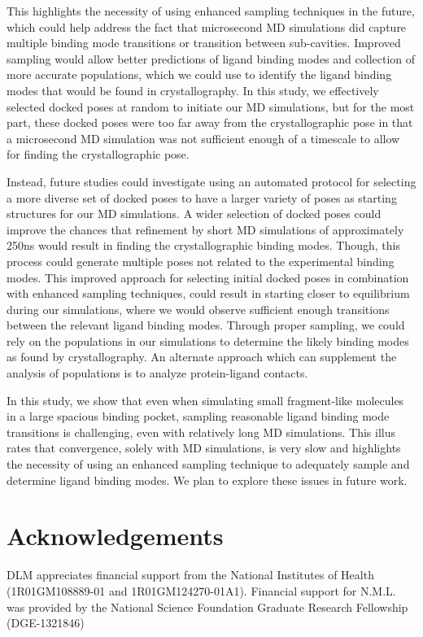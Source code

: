 This highlights the necessity of using enhanced sampling techniques in the future, which could help address the fact that microsecond MD simulations did capture multiple binding mode transitions or transition between sub-cavities.
Improved sampling would allow better predictions of ligand binding modes and collection of more accurate populations, which we could use to identify the ligand binding modes that would be found in crystallography.
In this study, we effectively selected docked poses at random to initiate our MD simulations, but for the most part, these docked poses were too far away from the crystallographic pose in that a microsecond MD simulation was not sufficient enough of a timescale to allow for finding the crystallographic pose.

Instead, future studies could investigate using an automated protocol for selecting a more diverse set of docked poses to have a larger variety of poses as starting structures for our MD simulations.
A wider selection of docked poses could improve the chances that refinement by short MD simulations of approximately 250ns would result in finding the crystallographic binding modes. 
Though, this process could generate multiple poses not related to the experimental binding modes.
This improved approach for selecting initial docked poses in combination with enhanced sampling techniques, could result in starting closer to equilibrium during our simulations, where we would observe sufficient enough transitions between the relevant ligand binding modes.
Through proper sampling, we could rely on the populations in our simulations to determine the likely binding modes as found by crystallography.
An alternate approach which can supplement the analysis of populations is to analyze protein-ligand contacts.

In this study, we show that even when simulating small fragment-like molecules in a large spacious binding pocket, sampling reasonable ligand binding mode transitions is challenging, even with relatively long MD simulations.
This illus rates that convergence, solely with MD simulations, is very slow and highlights the necessity of using an enhanced sampling technique to adequately sample and determine ligand binding modes.
We plan to explore these issues in future work.


\section{Acknowledgements}
DLM appreciates financial support from the National Institutes of Health (1R01GM108889-01 and 1R01GM124270-01A1). Financial support for N.M.L. was provided by the National Science Foundation Graduate Research Fellowship (DGE-1321846)

